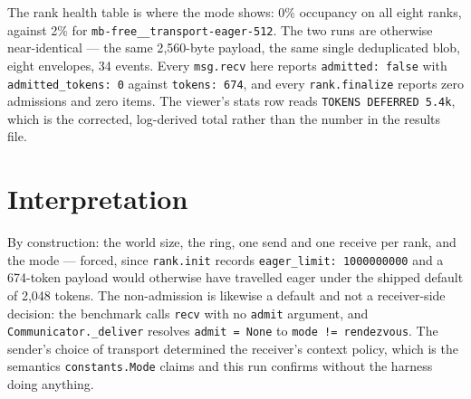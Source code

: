 \documentclass[11pt]{article}
\begin{document}
The rank health table is where the mode shows: 0\% occupancy on all eight ranks,
against 2\% for \texttt{mb-free\_\_transport-eager-512}. The two runs are otherwise
near-identical --- the same 2{,}560-byte payload, the same single deduplicated blob,
eight envelopes, 34 events. Every \texttt{msg.recv} here reports
\texttt{admitted: false} with \texttt{admitted\_tokens: 0} against \texttt{tokens:
674}, and every \texttt{rank.finalize} reports zero admissions and zero items. The
viewer's stats row reads \texttt{TOKENS DEFERRED 5.4k}, which is the corrected,
log-derived total rather than the number in the results file.

\section{Interpretation}

By construction: the world size, the ring, one send and one receive per rank, and the
mode --- forced, since \texttt{rank.init} records \texttt{eager\_limit: 1000000000}
and a 674-token payload would otherwise have travelled eager under the shipped
default of 2{,}048 tokens. The non-admission is likewise a default and not a
receiver-side decision: the benchmark calls \texttt{recv} with no \texttt{admit}
argument, and \texttt{Communicator.\_deliver} resolves \texttt{admit = None} to
\texttt{mode != rendezvous}. The sender's choice of transport determined the
receiver's context policy, which is the semantics \texttt{constants.Mode} claims and
this run confirms without the harness doing anything.
\end{document}
